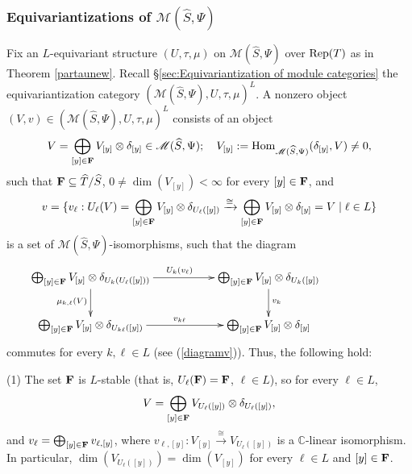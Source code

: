 \documentclass{amsart}
\theoremstyle{definition}
\newcommand{\Rep}{{\rm Rep}}
\newcommand{\M}{\mathscr{M}}
\newcommand{\ot}{\otimes}
\numberwithin{equation}{section}
\begin{document}
\subsubsection{Equivariantizations of $\M(\widehat{S},\Psi)$}\label{sec:Equivariantizations of M}
Fix an $L$-equivariant structure $(U,\tau,\mu)$ on $\M(\widehat{S},\Psi)$ over $\Rep(T)$ as in Theorem \ref{partaunew}. Recall \S\ref{sec:Equivariantization of module categories} the equivariantization category $\left(\M(\widehat{S},\Psi),U,\tau,\mu\right)^L$. A nonzero object $(V,v)\in \left(\M(\widehat{S},\Psi),U,\tau,\mu\right)^L$ consists of an object 
\begin{equation}\label{decompV}
V=\bigoplus_{[y]\in {\bf F}}V_{[y]}\ot\delta_{[y]}\in \M(\widehat{S},\Psi);\quad V_{[y]}:={\rm Hom}_{\M(\widehat{S},\Psi)}(\delta_{[y]},V)\ne 0,
\end{equation} 
such that ${\bf F}\subseteq \widehat{T}/\widehat{S}$, $0\ne\dim(V_{[y]})<\infty$ for every $[y]\in {\bf F}$, and   
$$v=\{v_{\ell}: U_{\ell}(V)=\bigoplus_{[y]\in {\bf F}}V_{[y]}\ot\delta_{U_{\ell}([y])}\xrightarrow{\cong} \bigoplus_{[y]\in {\bf F}}V_{[y]}\ot\delta_{[y]}=V\mid {\ell}\in L\}$$ 
is a set of $\M(\widehat{S},\Psi)$-isomorphisms, such that the diagram 
\begin{equation*}
\xymatrix{\bigoplus_{[y]\in {\bf F}}V_{[y]}\ot\delta_{U_k(U_{\ell}([y]))}\ar[d]_{\mu_{k,\ell}(V)}\ar[rr]^{U_k(v_{\ell})}&&\bigoplus_{[y]\in {\bf F}}V_{[y]}\ot\delta_{U_k([y])}\ar[d]^{v_k} &&\\
\bigoplus_{[y]\in {\bf F}}V_{[y]}\ot\delta_{U_{k\ell}([y])}\ar[rr]^{v_{k\ell}}&& \bigoplus_{[y]\in {\bf F}}V_{[y]}\ot\delta_{[y]}&&}
\end{equation*}
commutes for every $k,\ell\in L$ (see (\ref{diagramv})). Thus, the following hold:

(1) The set ${\bf F}$ is $L$-stable (that is, $U_{\ell}({\bf F})={\bf F}$, $\ell\in L$), so for every $\ell\in L$, 
$$V=\bigoplus_{[y]\in {\bf F}}V_{U_{\ell}([y])}\ot\delta_{U_{\ell}([y])},$$   
and $v_{\ell}=\bigoplus_{[y]\in {\bf F}}v_{\ell,[y]}$, where $v_{\ell,[y]}:V_{[y]}\xrightarrow{\cong}V_{U_{\ell}([y])}$ is a $\mathbb{C}$-linear isomorphism. In particular, $\dim(V_{U_{\ell}([y])})=\dim(V_{[y]})$ for every $\ell\in L$ and $[y]\in {\bf F}$.
\end{document}
